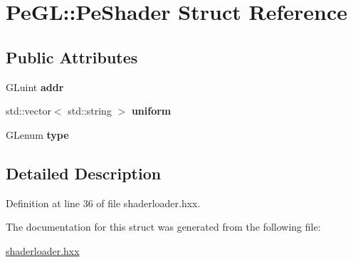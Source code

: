 \hypertarget{structPeGL_1_1PeShader}{\section{Pe\-G\-L\-:\-:Pe\-Shader Struct Reference}
\label{structPeGL_1_1PeShader}
}
\subsection*{Public Attributes}
\begin{DoxyCompactItemize}
\item 
\hypertarget{structPeGL_1_1PeShader_acd79f631a095b8b094b1b31f02b1b0f6}{G\-Luint {\bfseries addr}}\label{structPeGL_1_1PeShader_acd79f631a095b8b094b1b31f02b1b0f6}

\item 
\hypertarget{structPeGL_1_1PeShader_acc8d150f3c8ad5589c81cef5ace3b189}{std\-::vector$<$ std\-::string $>$ {\bfseries uniform}}\label{structPeGL_1_1PeShader_acc8d150f3c8ad5589c81cef5ace3b189}

\item 
\hypertarget{structPeGL_1_1PeShader_a72a5538c6f7a96e5b9f5598827b2a3ad}{G\-Lenum {\bfseries type}}\label{structPeGL_1_1PeShader_a72a5538c6f7a96e5b9f5598827b2a3ad}

\end{DoxyCompactItemize}


\subsection{Detailed Description}


Definition at line 36 of file shaderloader.\-hxx.



The documentation for this struct was generated from the following file\-:\begin{DoxyCompactItemize}
\item 
\hyperlink{shaderloader_8hxx}{shaderloader.\-hxx}\end{DoxyCompactItemize}
